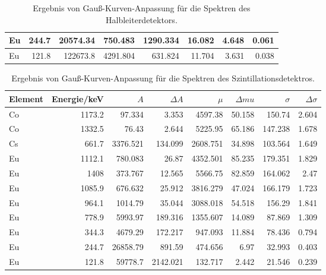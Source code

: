 \documentclass[ngerman,11pt]{article}
\begin{document}
\begin{table}[htbp]
\begin{tabular}{|l|r|r|r|r|r|r|r|}
		Eu      & 244.7                           & 20574.34                & 750.483                        & 1290.334                  & 16.082                          & 4.648                        & 0.061                               \\ \hline
		Eu      & 121.8                           & 122673.8                & 4291.804                       & 631.824                   & 11.704                          & 3.631                        & 0.038                           \\ \hline   
	\end{tabular}
	\caption{Ergebnis von Gau\ss-Kurven-Anpassung f\"ur die Spektren des Halbleiterdetektors.}
	\label{tab:gefit}
\end{table}
\begin{table}[htbp]
	\centering
	\begin{tabular}{|l|r|r|r|r|r|r|r|}
		\hline
		Element &
		{Energie/keV} &
		{$A$} &
		{$\Delta A$} &
		{$\mu$} &
		{$\Delta mu$} &
		{$\sigma$} &
		{$\Delta \sigma$} \\ \hline
		Co & 1173.2 & 97.334   & 3.353    & 4597.38  & 50.158 & 150.74  & 2.604 \\ \hline
		Co & 1332.5 & 76.43    & 2.644    & 5225.95  & 65.186 & 147.238 & 1.678 \\ \hline
		Cs & 661.7  & 3376.521 & 134.099  & 2608.751 & 34.898 & 103.564 & 1.649 \\ \hline
		Eu & 1112.1 & 780.083  & 26.87    & 4352.501 & 85.235 & 179.351 & 1.829 \\ \hline
		Eu & 1408   & 373.767  & 12.565   & 5566.75  & 82.859 & 164.062 & 2.47  \\ \hline
		Eu & 1085.9 & 676.632  & 25.912   & 3816.279 & 47.024 & 166.179 & 1.723 \\ \hline
		Eu & 964.1  & 1014.79  & 35.044   & 3088.018 & 54.518 & 156.29  & 1.841 \\ \hline
		Eu & 778.9  & 5993.97  & 189.316  & 1355.607 & 14.089 & 87.869  & 1.309 \\ \hline
		Eu & 344.3  & 4679.29  & 172.217  & 947.093  & 11.884 & 78.436  & 0.794 \\ \hline
		Eu & 244.7  & 26858.79 & 891.59   & 474.656  & 6.97   & 32.993  & 0.403 \\ \hline
		Eu & 121.8  & 59778.7  & 2142.021 & 132.717  & 2.442  & 21.546  & 0.239 \\ \hline
	\end{tabular}
	\caption{Ergebnis von Gau\ss-Kurven-Anpassung f\"ur die Spektren des Szintillationsdetektros.}
	\label{tab:szfit}
\end{table}
\end{document}
